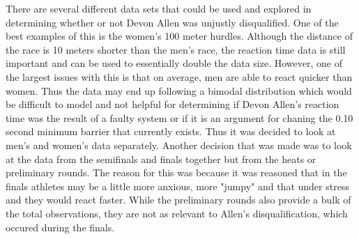 \documentclass[12pt, letterpaper, titlepage]{article}
\begin{document}
There are several different data sets that could be used and explored in determining 
whether or not Devon Allen was unjustly disqualified.  One of the best examples of this
is the women's 100 meter hurdles. Although the distance of the race is 10 meters shorter
than the men's race, the reaction time data is still important and can be used to
essentially double the data size.  However, one of the largest issues with this is that on average, men are able to react quicker than women.  Thus the data may end up following
a bimodal distribution which would be difficult to model and not helpful for determining
if Devon Allen's reaction time was the result of a faulty system or if it is an argument
for chaning the 0.10 second minimum barrier that currently exists.  Thus it was decided
to look at men's and women's data separately.  Another decision that was made was to look
at the data from the semifinals and finals together but from the heats or preliminary rounds.  The reason for this was because it was reasoned that in the finals athletes may
be a little more anxious, more "jumpy" and that under stress and they would react faster.
While the preliminary rounds also provide a bulk of the total observations, they are not
as relevant to Allen's disqualification, which occured during the finals.
\end{document}
